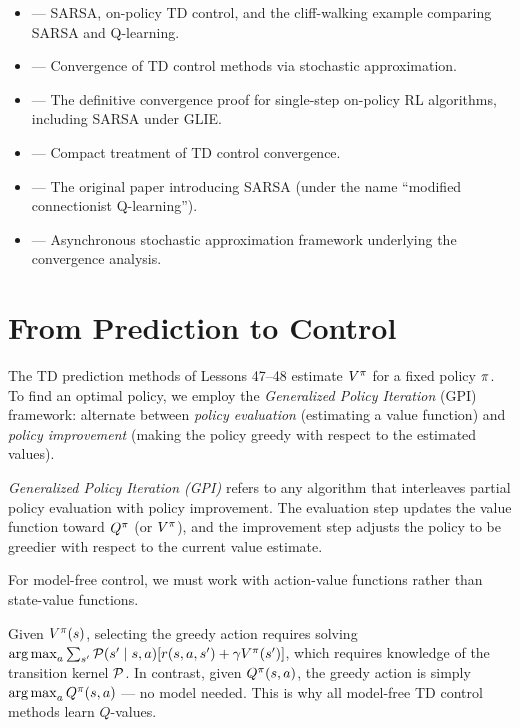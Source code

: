 \documentclass[11pt,a4paper]{article}
\begin{document}
\begin{itemize}[leftmargin=2em]
  \item \citet[Chapter 6, Sections 6.4--6.5]{suttonbarto2018} ---
    SARSA, on-policy TD control, and the cliff-walking example
    comparing SARSA and Q-learning.
  \item \citet[Chapter 4]{bertsekas1996} --- Convergence of TD
    control methods via stochastic approximation.
  \item \citet{singh2000} --- The definitive convergence proof for
    single-step on-policy RL algorithms, including SARSA under GLIE.
  \item \citet[Section 4.2]{szepesvari2010} --- Compact treatment of
    TD control convergence.
  \item \citet{rummery1994} --- The original paper introducing SARSA
    (under the name ``modified connectionist Q-learning'').
  \item \citet{tsitsiklis1994} --- Asynchronous stochastic
    approximation framework underlying the convergence analysis.
\end{itemize}

\section{From Prediction to Control}
\label{sec:prediction_to_control}

The TD prediction methods of Lessons 47--48 estimate $V^{\pi}$ for a
fixed policy $\pi$. To find an optimal policy, we employ the
\emph{Generalized Policy Iteration} (GPI) framework: alternate between
\emph{policy evaluation} (estimating a value function) and
\emph{policy improvement} (making the policy greedy with respect to
the estimated values).

\begin{definition}
\label{def:gpi}
\emph{Generalized Policy Iteration (GPI)} refers to any algorithm
that interleaves partial policy evaluation with policy improvement.
The evaluation step updates the value function toward $Q^{\pi}$
(or $V^{\pi}$), and the improvement step adjusts the policy to be
greedier with respect to the current value estimate.
\end{definition}

For model-free control, we must work with action-value functions
rather than state-value functions.

\begin{remark}
\label{rem:why_q}
Given $V^{\pi}(s)$, selecting the greedy action requires solving
$\operatorname{arg\,max}_a \sum_{s'} \mathcal{P}(s' \mid s,a)[r(s,a,s') + \gamma
V^{\pi}(s')]$, which requires knowledge of the transition kernel
$\mathcal{P}$. In contrast, given $Q^{\pi}(s,a)$, the greedy action is
simply $\operatorname{arg\,max}_a Q^{\pi}(s,a)$ --- no model needed. This is why all
model-free TD control methods learn $Q$-values.
\end{remark}
\end{document}
